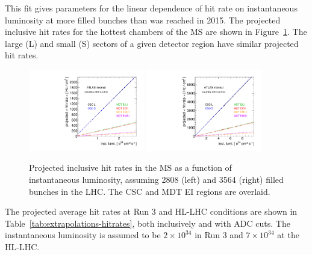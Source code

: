 This fit gives parameters for the linear dependence of hit rate on instantaneous luminosity at more filled bunches than was reached in 2015. The projected inclusive hit rates for the hottest chambers of the MS are shown in Figure~\ref{fig:extrapolations-hitrates-raw}. The large (L) and small (S) sectors of a given detector region have similar projected hit rates.

\begin{figure}
  \begin{center}
    \includegraphics[width=0.45\textwidth]{./figures/extrapolate_vs_lumi_raw_2808.pdf}
    \includegraphics[width=0.45\textwidth]{./figures/extrapolate_vs_lumi_raw_3564.pdf}
    \caption{Projected inclusive hit rates in the MS as a function of instantaneous luminosity, assuming 2808 (left) and 3564 (right) filled bunches in the LHC. The CSC and MDT EI regions are overlaid.}
    \label{fig:extrapolations-hitrates-raw}
  \end{center}
\end{figure}

The projected average hit rates at Run 3 and HL-LHC conditions are shown in Table~\ref{tab:extrapolations-hitrates}, both inclusively and with ADC cuts. The instantaneous luminosity is assumed to be $2\times10^{34}$ in Run 3 and $7\times10^{34}$ at the HL-LHC. 

\newcommand*{\hspfou}{\hspace*{0.4cm}}

